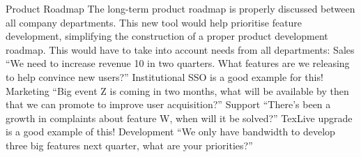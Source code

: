 \documentclass[11pt,a4paper,parskip=half]{scrartcl}
\begin{document}
Product Roadmap
The long-term product roadmap is properly discussed between all company departments. This new tool would help prioritise feature development, simplifying the construction of a proper product development roadmap. 
This would have to take into account needs from all departments:
Sales
“We need to increase revenue 10 in two quarters. What features are we releasing to help convince new users?”
Institutional SSO is a good example for this!
Marketing
“Big event Z is coming in two months, what will be available by then that we can promote to improve user acquisition?”
Support
“There’s been a growth in complaints about feature W, when will it be solved?”
TexLive upgrade is a good example of this!
Development
“We only have bandwidth to develop three big features next quarter, what are your priorities?”
\end{document}
